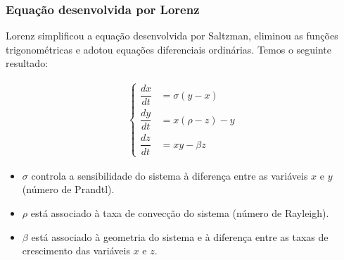 \begin{frame}[t]
    \frametitle{Equação desenvolvida por Lorenz}
    \scriptsize
    Lorenz simplificou a equação desenvolvida por Saltzman, eliminou as funções trigonométricas e adotou equações diferenciais ordinárias. Temos o seguinte resultado:

    \begin{align*}
        \begin{cases}
            \dfrac{dx}{dt} &= \sigma(y-x) \\[6pt]
            \dfrac{dy}{dt} &= x(\rho - z) - y \\[6pt]
            \dfrac{dz}{dt} &= xy - \beta z
        \end{cases}
    \end{align*}

    \vspace{0.2cm}

    \begin{itemize}
        \item $\sigma$ controla a sensibilidade do sistema à diferença entre as variáveis $x$ e $y$ (número de Prandtl). 
        \item $\rho$ está associado à taxa de convecção do sistema (número de Rayleigh).
        \item $\beta$ está associado à geometria do sistema e à diferença entre as taxas de crescimento das variáveis $x$ e $z$.
    \end{itemize}
\end{frame}
    
